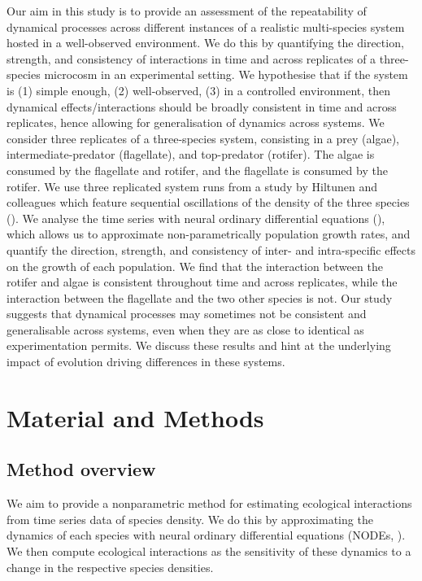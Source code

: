 \documentclass[11pt, oneside]{article}
\begin{document}
Our aim in this study is to provide an assessment of the repeatability of dynamical processes across different instances of a realistic multi-species system hosted in a well-observed environment.
We do this by quantifying the direction, strength, and consistency of interactions in time and across replicates of a three-species microcosm in an experimental setting.
We hypothesise that if the system is (1) simple enough, (2) well-observed, (3) in a controlled environment, then dynamical effects/interactions should be broadly consistent in time and across replicates, hence allowing for generalisation of dynamics across systems. 
We consider three replicates of a three-species system, consisting in a prey (algae), intermediate-predator (flagellate), and top-predator (rotifer).
The algae is consumed by the flagellate and rotifer, and the flagellate is consumed by the rotifer.
We use three replicated system runs from a study by Hiltunen and colleagues which feature sequential oscillations of the density of the three species (\cite{Hiltunen2013}).
We analyse the time series with neural ordinary differential equations (\cite{Bonnaffe2021a}), which allows us to approximate non-parametrically population growth rates, and quantify the direction, strength, and consistency of inter- and intra-specific effects on the growth of each population.
We find that the interaction between the rotifer and algae is consistent throughout time and across replicates, while the interaction between the flagellate and the two other species is not.
Our study suggests that dynamical processes may sometimes not be consistent and generalisable across systems, even when they are as close to identical as experimentation permits. %
We discuss these results and hint at the underlying impact of evolution driving differences in these systems.

\section{Material and Methods}

\subsection{Method overview}

We aim to provide a nonparametric method for estimating ecological interactions from time series data of species density. 
We do this by approximating the dynamics of each species with neural ordinary differential equations (NODEs, \cite{Bonnaffe2021a}). 
We then compute ecological interactions as the sensitivity of these dynamics to a change in the respective species densities.
\end{document}
